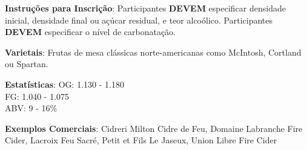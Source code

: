 \textbf{Instruções para Inscrição}: Participantes \textbf{DEVEM} especificar densidade inicial, densidade final ou açúcar residual, e teor alcoólico. Participantes \textbf{DEVEM} especificar o nível de carbonatação.

\textbf{Varietais}: Frutas de mesa clássicas norte-americanas como McIntosh, Cortland ou Spartan.

\textbf{Estatísticas}: OG: 1.130 - 1.180 \\
\phantom{ } \hspace{16.5mm} FG: 1.040 - 1.075 \\
\phantom{ } \hspace{16.5mm} ABV: 9 - 16\%

\textbf{Exemplos Comerciais}: Cidreri Milton Cidre de Feu, Domaine Labranche Fire Cider, Lacroix Feu Sacré, Petit et Fils Le Jaseux, Union Libre Fire Cider
